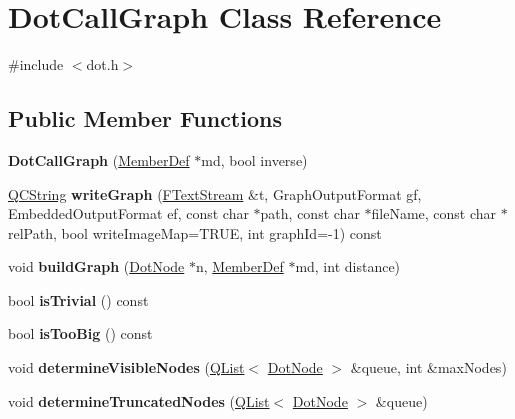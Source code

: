 \hypertarget{class_dot_call_graph}{}\section{Dot\+Call\+Graph Class Reference}
\label{class_dot_call_graph}


{\ttfamily \#include $<$dot.\+h$>$}

\subsection*{Public Member Functions}
\begin{DoxyCompactItemize}
\item 
\mbox{\label{class_dot_call_graph_acb6d03dcd52cf3a4d3e8ea623bdb2da0}} 
{\bfseries Dot\+Call\+Graph} (\mbox{\hyperlink{class_member_def}{Member\+Def}} $\ast$md, bool inverse)
\item 
\mbox{\label{class_dot_call_graph_a495ccb0c2c8b1dfca2732f3f36c3d947}} 
\mbox{\hyperlink{class_q_c_string}{Q\+C\+String}} {\bfseries write\+Graph} (\mbox{\hyperlink{class_f_text_stream}{F\+Text\+Stream}} \&t, Graph\+Output\+Format gf, Embedded\+Output\+Format ef, const char $\ast$path, const char $\ast$file\+Name, const char $\ast$rel\+Path, bool write\+Image\+Map=T\+R\+UE, int graph\+Id=-\/1) const
\item 
\mbox{\label{class_dot_call_graph_a37d014d7543ae64f653abdae4988d617}} 
void {\bfseries build\+Graph} (\mbox{\hyperlink{class_dot_node}{Dot\+Node}} $\ast$n, \mbox{\hyperlink{class_member_def}{Member\+Def}} $\ast$md, int distance)
\item 
\mbox{\label{class_dot_call_graph_ae7f297903a3fe6ea2ac638f381125767}} 
bool {\bfseries is\+Trivial} () const
\item 
\mbox{\label{class_dot_call_graph_a1f0c9cfab017f669e5c83e4ecd9ef760}} 
bool {\bfseries is\+Too\+Big} () const
\item 
\mbox{\label{class_dot_call_graph_addf14efc1a3021713c31070fe7e75641}} 
void {\bfseries determine\+Visible\+Nodes} (\mbox{\hyperlink{class_q_list}{Q\+List}}$<$ \mbox{\hyperlink{class_dot_node}{Dot\+Node}} $>$ \&queue, int \&max\+Nodes)
\item 
\mbox{\label{class_dot_call_graph_a1bcba0cd9ce18996902651b8d306033d}} 
void {\bfseries determine\+Truncated\+Nodes} (\mbox{\hyperlink{class_q_list}{Q\+List}}$<$ \mbox{\hyperlink{class_dot_node}{Dot\+Node}} $>$ \&queue)
\end{DoxyCompactItemize}
